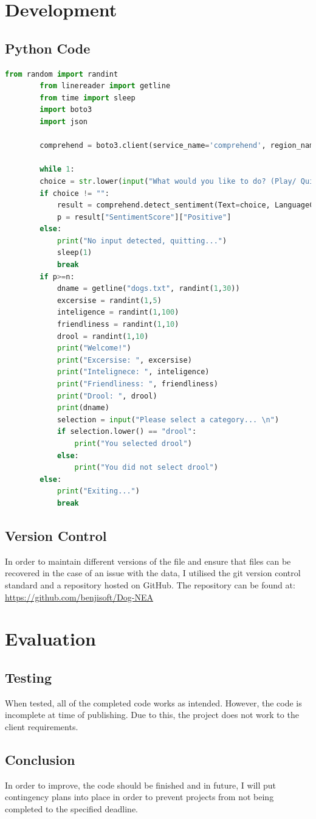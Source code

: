 \documentclass[a4paper]{article}
\begin{document}
	\section{Development}
	\subsection{Python Code}
	\begin{lstlisting}[language=Python]
		from random import randint
		from linereader import getline
		from time import sleep
		import boto3
		import json
		
		comprehend = boto3.client(service_name='comprehend', region_name='eu-west-1')
		
		while 1: 
		choice = str.lower(input("What would you like to do? (Play/ Quit)"))
		if choice != "":
			result = comprehend.detect_sentiment(Text=choice, LanguageCode='en') #, sort_keys=True, indent=4)
			p = result["SentimentScore"]["Positive"]
		else: 
			print("No input detected, quitting...")
			sleep(1)
			break
		if p>=n:
			dname = getline("dogs.txt", randint(1,30))
			excersise = randint(1,5)
			inteligence = randint(1,100)
			friendliness = randint(1,10)
			drool = randint(1,10)
			print("Welcome!")
			print("Excersise: ", excersise)
			print("Intelignece: ", inteligence)
			print("Friendliness: ", friendliness)
			print("Drool: ", drool)
			print(dname)
			selection = input("Please select a category... \n")
			if selection.lower() == "drool":
				print("You selected drool")
			else: 
				print("You did not select drool")
		else:
			print("Exiting...")
			break
	\end{lstlisting}
	\subsection{Version Control}
	In order to maintain different versions of the file and ensure that files can be recovered in the case of an issue with the data, I utilised the git version control standard and a repository hosted on GitHub. The repository can be found at: \url{https://github.com/benjisoft/Dog-NEA}
	\pagebreak
	\section{Evaluation}
	\subsection{Testing}
	When tested, all of the completed code works as intended. However, the code is incomplete at time of publishing. Due to this, the project does not work to the client requirements. 
	\subsection{Conclusion}
	In order to improve, the code should be finished and in future, I will put contingency plans into place in order to prevent projects from not being completed to the specified deadline. 
\end{document}
